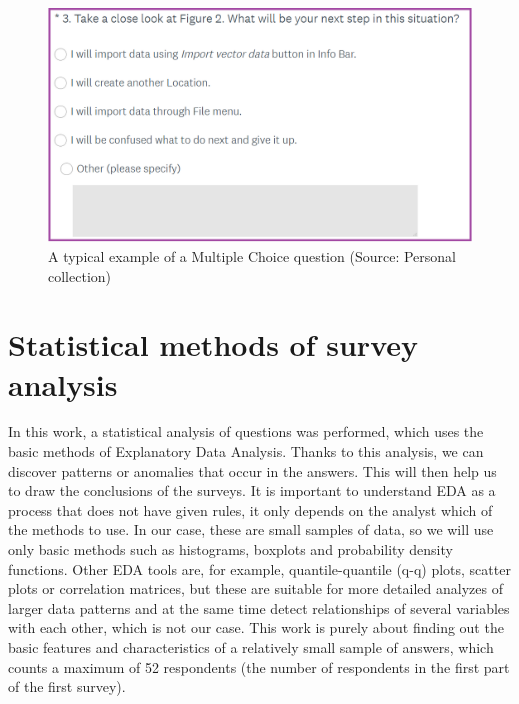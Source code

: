 \documentclass[a4paper,10pt,twoside]{article}
\begin{document}
\vspace{0.3cm}
\begin{figure}[hbt!] 
\begin{center}
\includegraphics[width=14cm]{../pictures/multiple_choice_question.png} 
\caption[A typical example of a Multiple Choice question]{A typical example of a Multiple Choice question (Source: Personal collection)}
\label{fig:multiple_choice_question}
\end{center}
\end{figure}


\newpage
\vspace*{-1cm}
\section{Statistical methods of survey analysis}
\label{sec:qstat}

\noindent In this work, a statistical analysis of questions was performed, which uses the basic methods of Explanatory Data Analysis. Thanks to this analysis, we can discover patterns or anomalies that occur in the answers. This will then help us to draw the conclusions of the surveys. It is important to understand EDA as a process that does not have given rules, it only depends on the analyst which of the methods to use. In our case, these are small samples of data, so we will use only basic methods such as histograms, boxplots and probability density functions. Other EDA tools are, for example, quantile-quantile (q-q) plots, scatter plots or correlation matrices, but these are suitable for more detailed analyzes of larger data patterns and at the same time detect relationships of several variables with each other, which is not our case. This work is purely about finding out the basic features and characteristics of a relatively small sample of answers, which counts a maximum of 52 respondents (the number of respondents in the first part of the first survey).
\end{document}
